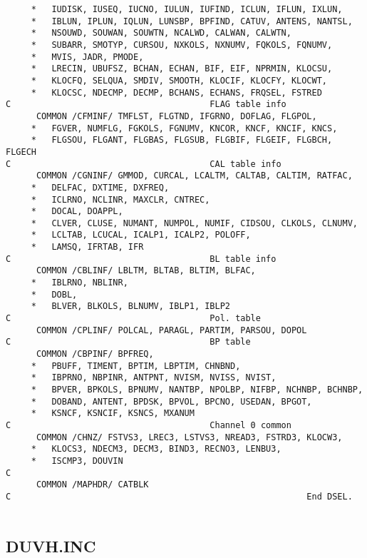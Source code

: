 \begin{verbatim}
     *   IUDISK, IUSEQ, IUCNO, IULUN, IUFIND, ICLUN, IFLUN, IXLUN,
     *   IBLUN, IPLUN, IQLUN, LUNSBP, BPFIND, CATUV, ANTENS, NANTSL,
     *   NSOUWD, SOUWAN, SOUWTN, NCALWD, CALWAN, CALWTN,
     *   SUBARR, SMOTYP, CURSOU, NXKOLS, NXNUMV, FQKOLS, FQNUMV,
     *   MVIS, JADR, PMODE,
     *   LRECIN, UBUFSZ, BCHAN, ECHAN, BIF, EIF, NPRMIN, KLOCSU,
     *   KLOCFQ, SELQUA, SMDIV, SMOOTH, KLOCIF, KLOCFY, KLOCWT,
     *   KLOCSC, NDECMP, DECMP, BCHANS, ECHANS, FRQSEL, FSTRED
C                                       FLAG table info
      COMMON /CFMINF/ TMFLST, FLGTND, IFGRNO, DOFLAG, FLGPOL,
     *   FGVER, NUMFLG, FGKOLS, FGNUMV, KNCOR, KNCF, KNCIF, KNCS,
     *   FLGSOU, FLGANT, FLGBAS, FLGSUB, FLGBIF, FLGEIF, FLGBCH, FLGECH
C                                       CAL table info
      COMMON /CGNINF/ GMMOD, CURCAL, LCALTM, CALTAB, CALTIM, RATFAC,
     *   DELFAC, DXTIME, DXFREQ,
     *   ICLRNO, NCLINR, MAXCLR, CNTREC,
     *   DOCAL, DOAPPL,
     *   CLVER, CLUSE, NUMANT, NUMPOL, NUMIF, CIDSOU, CLKOLS, CLNUMV,
     *   LCLTAB, LCUCAL, ICALP1, ICALP2, POLOFF,
     *   LAMSQ, IFRTAB, IFR
C                                       BL table info
      COMMON /CBLINF/ LBLTM, BLTAB, BLTIM, BLFAC,
     *   IBLRNO, NBLINR,
     *   DOBL,
     *   BLVER, BLKOLS, BLNUMV, IBLP1, IBLP2
C                                       Pol. table
      COMMON /CPLINF/ POLCAL, PARAGL, PARTIM, PARSOU, DOPOL
C                                       BP table
      COMMON /CBPINF/ BPFREQ,
     *   PBUFF, TIMENT, BPTIM, LBPTIM, CHNBND,
     *   IBPRNO, NBPINR, ANTPNT, NVISM, NVISS, NVIST,
     *   BPVER, BPKOLS, BPNUMV, NANTBP, NPOLBP, NIFBP, NCHNBP, BCHNBP,
     *   DOBAND, ANTENT, BPDSK, BPVOL, BPCNO, USEDAN, BPGOT,
     *   KSNCF, KSNCIF, KSNCS, MXANUM
C                                       Channel 0 common
      COMMON /CHNZ/ FSTVS3, LREC3, LSTVS3, NREAD3, FSTRD3, KLOCW3,
     *   KLOCS3, NDECM3, DECM3, BIND3, RECNO3, LENBU3,
     *   ISCMP3, DOUVIN
C
      COMMON /MAPHDR/ CATBLK
C                                                          End DSEL.


\end{verbatim}
\subsection{DUVH.INC}

